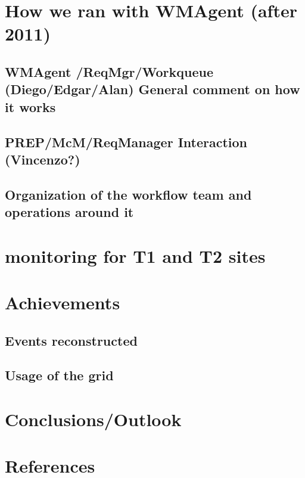 \documentclass[journal, transmag]{IEEEtran}
\begin{document}
\section{How we ran with WMAgent (after 2011)}
\subsection{WMAgent /ReqMgr/Workqueue (Diego/Edgar/Alan) General comment on how it works}
\subsection{PREP/McM/ReqManager Interaction (Vincenzo?)}
\subsection{Organization of the workflow team and operations around it }

\section{monitoring for T1 and T2 sites}
\section{Achievements}
\subsection{Events reconstructed}
\subsection{Usage of the grid}
\section{Conclusions/Outlook}
\section*{References}

\end{document}

